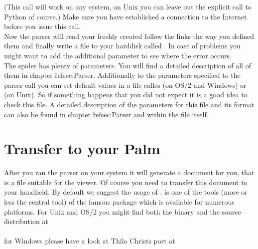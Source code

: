 
(This call will work on any system, on Unix you can leave out the
explicit call to Python of course.) Make sure you have established a
connection to the Internet before you issue this call.\\

Now the parser will read your freshly created  follow
the links the way you defined them and finally write a file to your
harddisk called . In case of problems you might
want to add the additional parameter  to see where the error
occurs.\\

\note{} The spider has plenty of parameters. You will find a detailed
description of all of them in chapter \~ref{sec:Parser}. Additionally
to the parameters specified to the parser call you can set default
values in a file calles  (on OS/2 and Windows) or
 (on Unix). So if something happens that you did not
expect it is a good idea to check this file. A detailed description of
the parameters for this file and its format can also be found in
chapter \~ref{sec:Parser} and within the file itself.

\section{Transfer to your Palm}

After you ran the parser on your system it will generate a document
for you, that is a file suitable for the viewer. Of course you need
to transfer this document to your handheld. By default we
suggest the usage of .  is one of
the tools (more or less the central tool) of the famous
 package which is available for numerous platforms.
For Unix and OS/2 you might find both the binary and the source
distribution at \\

\\

for Windows please have a look at Thilo Christs port at \\

\\

